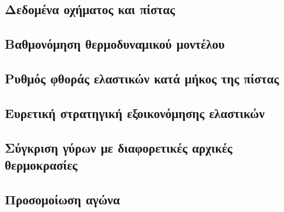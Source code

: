 \subsection{Δεδομένα οχήματος και πίστας}

\subsection{Βαθμονόμηση θερμοδυναμικού μοντέλου}

\subsection{Ρυθμός φθοράς ελαστικών κατά μήκος της πίστας}

\subsection{Ευρετική στρατηγική εξοικονόμησης ελαστικών}

\subsection{Σύγκριση γύρων με διαφορετικές αρχικές θερμοκρασίες}

\subsection{Προσομοίωση αγώνα}
